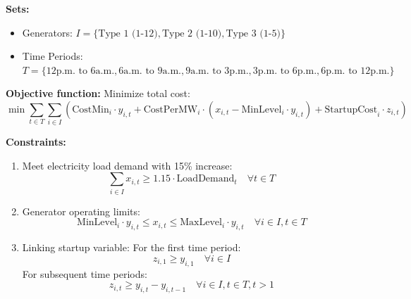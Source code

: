 \documentclass[a4paper,10pt]{article}
\begin{document}
\textbf{Sets:}
\begin{itemize}
  \item Generators: \(I = \{\text{Type 1 (1-12)}, \text{Type 2 (1-10)}, \text{Type 3 (1-5)}\}\)
  \item Time Periods: \(T = \{\text{12p.m. to 6a.m.}, \text{6a.m. to 9a.m.}, \text{9a.m. to 3p.m.}, \text{3p.m. to 6p.m.}, \text{6p.m. to 12p.m.}\}\)
\end{itemize}

\textbf{Objective function:}
Minimize total cost:
\[
  \min \sum_{t \in T} \sum_{i \in I} \left( \text{CostMin}_i \cdot y_{i,t} + \text{CostPerMW}_i \cdot (x_{i,t} - \text{MinLevel}_i \cdot y_{i,t}) + \text{StartupCost}_i \cdot z_{i,t} \right)
\]

\textbf{Constraints:}
\begin{enumerate}
  \item Meet electricity load demand with 15\% increase:
  \[\boxed{\sum_{i \in I} x_{i,t} \geq 1.15 \cdot \text{LoadDemand}_t \quad \forall t \in T}\]

  \item Generator operating limits:
  \[\boxed{\text{MinLevel}_i \cdot y_{i,t} \leq x_{i,t} \leq \text{MaxLevel}_i \cdot y_{i,t} \quad \forall i \in I, t \in T}\]

  \item Linking startup variable:
  For the first time period:
  \[\boxed{z_{i,1} \geq y_{i,1} \quad \forall i \in I}\]
  For subsequent time periods:
  \[\boxed{z_{i,t} \geq y_{i,t} - y_{i,t-1} \quad \forall i \in I, t \in T, t > 1}\]

\end{enumerate}
\end{document}

